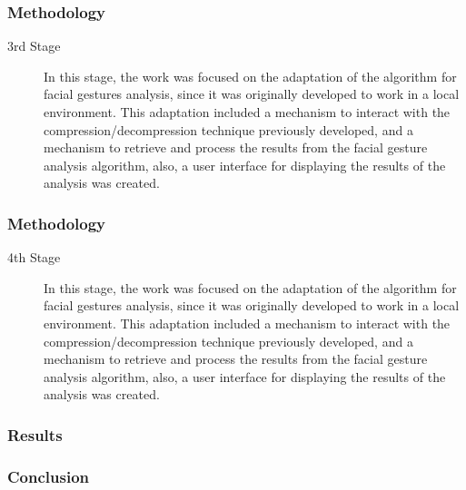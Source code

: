 \documentclass[compress]{beamer}
\begin{document}
\begin{frame}
	\frametitle{Methodology}
	\begin{description}
\item[3rd Stage] In this stage, the work was focused on the adaptation of the algorithm for facial gestures analysis, since it was originally developed to work in a local environment. This adaptation included a mechanism to interact with the compression/decompression technique previously developed, and a mechanism to retrieve and process the results from the facial gesture analysis algorithm, also, a user interface for displaying the results of the analysis was created.
\end{description}
\end{frame}

\begin{frame}
	\frametitle{Methodology}
	\begin{description}
\item[4th Stage] In this stage, the work was focused on the adaptation of the algorithm for facial gestures analysis, since it was originally developed to work in a local environment. This adaptation included a mechanism to interact with the compression/decompression technique previously developed, and a mechanism to retrieve and process the results from the facial gesture analysis algorithm, also, a user interface for displaying the results of the analysis was created.
\end{description}
\end{frame}

\begin{frame}[t,allowframebreaks]\frametitle{Results}

\end{frame}

\begin{frame}[t]\frametitle{Conclusion}
\end{frame}
\end{document}
